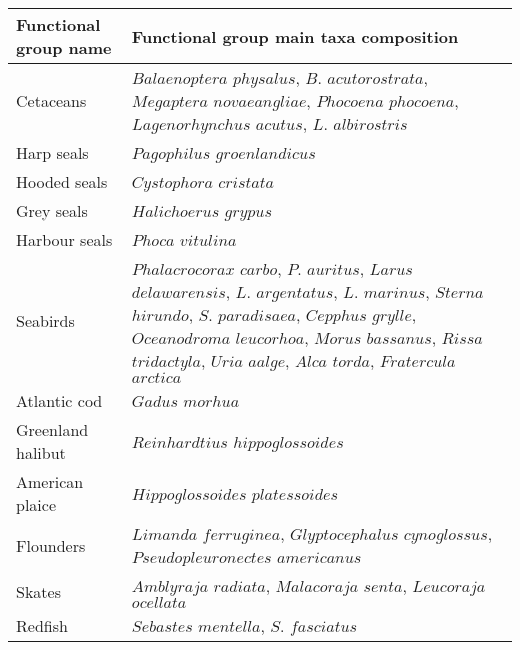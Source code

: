 \label{annIII}
\addtocounter{chapter}{1}
\setcounter{equation}{0}

\begin{table}[h!]
    \centering
    \small
    \begin{tabularx}{1\textwidth}{|s|b|}
        \hline
        Functional group name   & Functional group main taxa composition    \\
        \hline \hline
        Cetaceans                          & $Balaenoptera$ $physalus$, $B.$ $acutorostrata$, $Megaptera$ $novaeangliae$, $Phocoena$ $phocoena$, $Lagenorhynchus$ $acutus$, $L.$ $albirostris$  \\
        \hline
        Harp seals                         & $Pagophilus$ $groenlandicus$   \\
        \hline
        Hooded seals                       & $Cystophora$ $cristata$    \\
        \hline
        Grey seals                         & $Halichoerus$ $grypus$ \\
        \hline
        Harbour seals                      & $Phoca$ $vitulina$ \\
        \hline
        Seabirds                           & $Phalacrocorax$ $carbo$, $P.$ $auritus$, $Larus$ $delawarensis$, $L.$ $argentatus$, $L.$ $marinus$, $Sterna$ $hirundo$, $S.$ $paradisaea$, $Cepphus$ $grylle$, $Oceanodroma$ $leucorhoa$, $Morus$ $bassanus$, $Rissa$ $tridactyla$, $Uria$ $aalge$, $Alca$ $torda$, $Fratercula$ $arctica$ \\
        \hline
        Atlantic cod                       & $Gadus$ $morhua$   \\
        \hline
        Greenland halibut                  & $Reinhardtius$ $hippoglossoides$   \\
        \hline
        American plaice                    & $Hippoglossoides$ $platessoides$   \\
        \hline
        Flounders                          & $Limanda$ $ferruginea$, $Glyptocephalus$ $cynoglossus$, $Pseudopleuronectes$ $americanus$  \\
        \hline
        Skates                             & $Amblyraja$ $radiata$, $Malacoraja$ $senta$, $Leucoraja$ $ocellata$    \\
        \hline
        Redfish                            & $Sebastes$ $mentella$, $S.$ $fasciatus$    \\

\end{tabularx}
\end{table}
